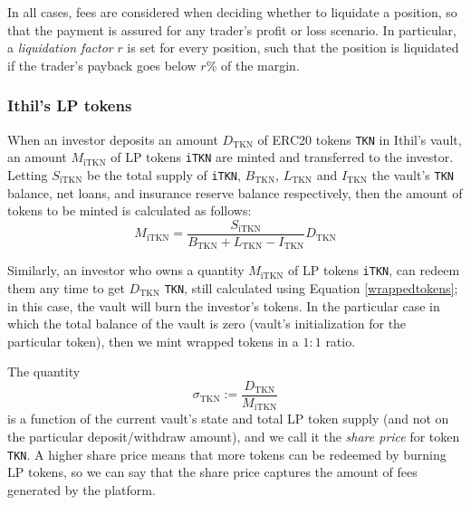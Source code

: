 \documentclass[a4paper,10 pt]{article}
\theoremstyle{definition}
\begin{document}
In all cases, fees are considered when deciding whether to liquidate a position, so that the payment is assured for any trader's profit or loss scenario. In particular, a \textit{liquidation factor} $r$ is set for every position, such that the position is liquidated if the trader's payback goes below $r$\% of the margin.

\subsubsection{Ithil's LP tokens}
When an investor deposits an amount $D_{\text{TKN}}$ of ERC20 tokens \verb|TKN| in Ithil's vault, an amount $M_{\text{iTKN}}$ of LP tokens \verb|iTKN| are minted and transferred to the investor. Letting $S_{\text{iTKN}}$ be the total supply of \verb|iTKN|, $B_{\text{TKN}}$, $L_{\text{TKN}}$ and $I_{\text{TKN}}$ the vault's \verb|TKN| balance, net loans, and insurance reserve balance respectively, then the amount of tokens to be minted is calculated as follows:
\begin{equation}\label{wrappedtokens}M_{\text{iTKN}} = \frac{S_{\text{iTKN}}}{B_{\text{TKN}} + L_{\text{TKN}} - I_{\text{TKN}}}D_{\text{TKN}}\end{equation}

Similarly, an investor who owns a quantity $M_{\text{iTKN}}$ of LP tokens \verb|iTKN|, can redeem them any time to get $D_{\text{TKN}}$ \verb|TKN|, still calculated using Equation \eqref{wrappedtokens}; in this case, the vault will burn the investor's tokens. In the particular case in which the total balance of the vault is zero (vault's initialization for the particular token), then we mint wrapped tokens in a $1:1$ ratio.

The quantity $$\sigma_{\text{TKN}} := \frac{D_{\text{TKN}}}{M_{\text{iTKN}}}$$ is a function of the current vault's state and total LP token supply (and not on the particular deposit/withdraw amount), and we call it the {\it share price} for token \verb|TKN|. A higher share price means that more tokens can be redeemed by burning LP tokens, so we can say that the share price captures the amount of fees generated by the platform.
\end{document}
